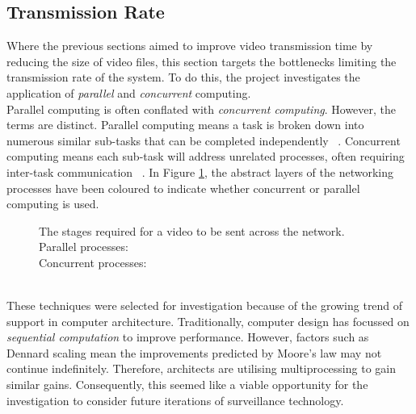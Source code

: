 \subsection{Transmission Rate}
\label{sec:parallelisation}
\setlength{\leftskip}{0.5cm}
\indent \indent
Where the previous sections aimed to improve video transmission time by reducing the size of video files, this section targets the bottlenecks limiting the transmission rate of the system. To do this, the project investigates the application of \textit{parallel} and \textit{concurrent} computing.
\smallskip \\ \indent
Parallel computing is often conflated with \textit{concurrent computing}. However, the terms are distinct. Parallel computing means a task is broken down into numerous similar sub-tasks that can be completed independently ~\cite{ParallelismVsConcurrency}. Concurrent computing means each sub-task will address unrelated processes, often requiring inter-task communication ~\cite{ParallelismVsConcurrency}. In Figure \ref{fig:parallelStack}, the abstract layers of the networking processes have been coloured to indicate whether concurrent or parallel computing is used.
\begin{figure}[htp]
    \centering
    \scalebox{0.6}{}
    \captionsetup{justification=centering}
    \caption[Abstract view of parallel processes]{The stages required for a video to be sent across the network.\medskip\\Parallel processes: \hl{\quad\quad\quad\quad}\smallskip\\Concurrent processes: \hl{\quad\quad\quad\quad}}
    \label{fig:parallelStack}
\end{figure}
\smallskip \\ \indent
These techniques were selected for investigation because of the growing trend of support in computer architecture. Traditionally, computer design has focussed on \textit{sequential computation} to improve performance. However, factors such as Dennard scaling \cite{Dennard} mean the improvements predicted by Moore's law \cite{Moore} may not continue indefinitely. Therefore, architects are utilising multiprocessing to gain similar gains. Consequently, this seemed like a viable opportunity for the investigation to consider future iterations of surveillance technology.

\setlength{\leftskip}{0cm}
